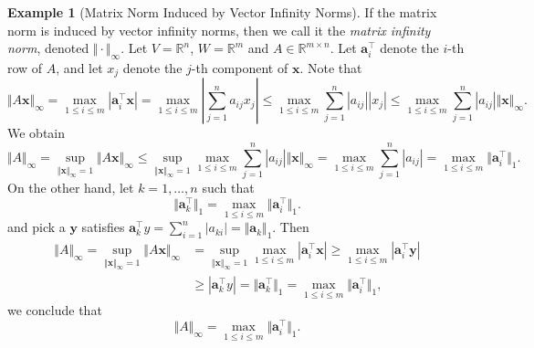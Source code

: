 \documentclass[12pt]{article}
\theoremstyle{definition}
\newtheorem{example}[theorem]{Example}
\begin{document}
\begin{example}[Matrix Norm Induced by Vector Infinity Norms]
    If the matrix norm is induced by vector infinity norms, then we call it the \textit{matrix infinity norm}, denoted $\Vert\cdot\Vert_\infty$. Let $V=\mathbb{R}^n$, $W=\mathbb{R}^m$ and $A\in\mathbb{R}^{m\times n}$. Let $\mathbf{a}_i^\top$ denote the $i$-th row of $A$, and let $x_j$ denote the $j$-th component of $\mathbf{x}$. Note that
    \[ \Vert A\mathbf{x}\Vert_\infty
    = \max_{1\leq i\leq m} \left|\mathbf{a}_i^\top \mathbf{x}\right| 
    = \max_{1\leq i\leq m} \left| \sum_{j=1}^n a_{ij}x_j \right| 
    \leq \max_{1\leq i\leq m} \sum_{j=1}^n |a_{ij}| |x_j| 
    \leq \max_{1\leq i\leq m} \sum_{j=1}^n |a_{ij}| \Vert\mathbf{x}\Vert_\infty.
    \]
    We obtain
    \[ \Vert A\Vert_\infty
    = \sup_{\Vert\mathbf{x}\Vert_\infty=1} \Vert A\mathbf{x}\Vert_\infty
    \leq \sup_{\Vert\mathbf{x}\Vert_\infty=1} \max_{1\leq i\leq m} \sum_{j=1}^n |a_{ij}| \Vert\mathbf{x}\Vert_\infty 
    = \max_{1\leq i\leq m} \sum_{j=1}^n |a_{ij}| 
    = \max_{1\leq i\leq m} \Vert\mathbf{a}_i^\top \Vert_1.
    \]
    On the other hand, let $k=1,\ldots,n$ such that
    \[ \Vert\mathbf{a}_k^\top\Vert_1
    = \max_{1\leq i\leq m} \Vert\mathbf{a}_i^\top\Vert_1.
    \]
    and pick a $\mathbf{y}$ satisfies $\mathbf{a}_k^\top y=\sum\limits_{i=1}^n{|a_{ki}|}=\Vert \mathbf{a}_k\Vert_1$. Then
    \begin{align*}
        \Vert A\Vert_\infty
    = \sup_{\Vert\mathbf{x}\Vert_\infty=1} \Vert A\mathbf{x}\Vert_\infty
    &=\sup_{\Vert\mathbf{x}\Vert_\infty=1}\max_{1\leq i\leq m} \left|\mathbf{a}_i^\top \mathbf{x}\right| \geq \max_{1\leq i\leq m} \left|\mathbf{a}_i^\top \mathbf{y}\right|\\
    &\geq |\mathbf{a}_k^\top y|=\Vert\mathbf{a}_k^\top\Vert_1
    = \max_{1\leq i\leq m} \Vert\mathbf{a}_i^\top\Vert_1,
    \end{align*}
    we conclude that
    \[\Vert A\Vert_\infty=\max_{1\leq i\leq m} \Vert\mathbf{a}_i^\top\Vert_1.\]
\end{example}
\end{document}
